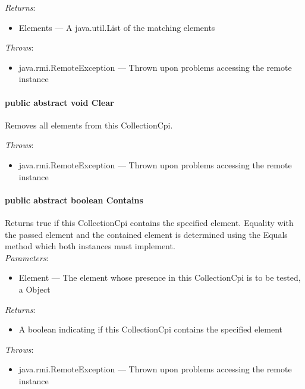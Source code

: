 \documentclass[$Date: 2003/06/26 19:29:31 $]{glabarticle}
\begin{document}
\textit{Returns}:
\begin{itemize}
\item[] Elements --- A java.util.List of the matching elements 
\end{itemize}

 \textit{Throws}:
 \begin{itemize}
 \item[] java.rmi.RemoteException --- Thrown upon problems accessing the remote instance 
 \end{itemize}

\paragraph{public abstract void Clear}

Removes all elements from this CollectionCpi.

 \textit{Throws}:
 \begin{itemize}
 \item[] java.rmi.RemoteException --- Thrown upon problems accessing the remote instance 
 \end{itemize}

\paragraph{public abstract boolean Contains}

Returns true if this CollectionCpi contains the specified
element. Equality with the passed element and the contained element is
determined using the Equals method which both instances must
implement.\\

\textit{Parameters}:
\begin{itemize}
\item[] Element --- The element whose presence in this CollectionCpi is to be tested, a Object
\end{itemize}

\textit{Returns}:
\begin{itemize}
\item[] A boolean indicating if this CollectionCpi contains the specified element
\end{itemize}

 \textit{Throws}:
 \begin{itemize}
 \item[] java.rmi.RemoteException --- Thrown upon problems accessing the remote instance 
 \end{itemize}
\end{document}

